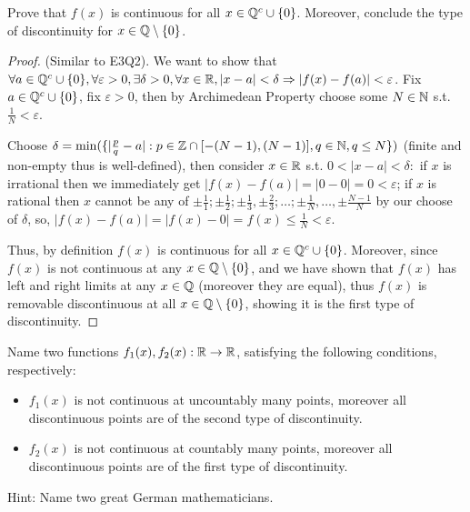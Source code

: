 \documentclass{homework}
\newcommand{\R}{\bb{R}} %
\newcommand{\Q}{\bb{Q}} %
\newcommand{\Z}{\bb{Z}} %
\newcommand{\N}{\bb{N}} %
\newcommand{\Ra}{\Rightarrow}
\newcommand{\?}{\stackrel{?}{=}}
\newcommand{\ep}{\varepsilon}
\theoremstyle{definition}
\begin{document}
\question[3] Prove that $f(x)$ is continuous for all $x\in\Q^c\cup\{0\}$. Moreover, conclude the type of discontinuity for $x\in\Q\setminus\{0\}$.

\begin{proof}
    (Similar to E3Q2). We want to show that $\forall a\in\Q^c\cup\{0\},\forall\ep>0,\exists\delta>0,\forall x\in\R, |x-a|<\delta\Ra|f(x)-f(a)|<\ep$. Fix $a\in\Q^c\cup\{0\}$, fix $\ep>0$, then by Archimedean Property choose some $N\in\N$ s.t. $\frac1N<\ep$.

    Choose $\delta=\min(\{|\frac{p}{q}-a|:p\in\Z\cap[-(N-1), (N-1)], q\in\N, q\leq N\})$ (finite and non-empty thus is well-defined), then consider $x\in\R$ s.t. $0<|x-a|<\delta:$ if $x$ is irrational then we immediately get $|f(x)-f(a)|=|0-0|=0<\ep$; if $x$ is rational then $x$ cannot be any of $\pm\frac11; \pm\frac12; \pm\frac13, \pm\frac23; \ldots; \pm\frac1N, \ldots, \pm\frac{N-1}{N}$ by our choose of $\delta$, so, $|f(x)-f(a)|=|f(x)-0|=f(x)\leq\frac1{N}<\ep$.

    Thus, by definition $f(x)$ is continuous for all $x\in\Q^c\cup\{0\}$. Moreover, since $f(x)$ is not continuous at any $x\in\Q\setminus\{0\}$, and we have shown that $f(x)$ has left and right limits at any $x\in\Q$ (moreover they are equal), thus $f(x)$ is removable discontinuous at all $x\in\Q\setminus\{0\}$, showing it is the first type of discontinuity.
\end{proof}

\question[4] Name two functions $f_1(x), f_2(x):\R\to\R$, satisfying the following conditions, respectively:
\begin{itemize}
    \item $f_1(x)$ is not continuous at uncountably many points, moreover all discontinuous points are of the second type of discontinuity.
    \item $f_2(x)$ is not continuous at countably many points, moreover all discontinuous points are of the first type of discontinuity.
\end{itemize}

Hint: Name two great German mathematicians. 
\end{document}
